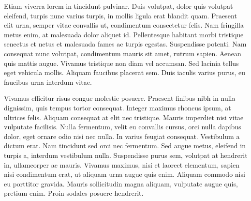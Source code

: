 \documentclass{article}
\begin{document}
Etiam viverra lorem in tincidunt pulvinar.
Duis volutpat, dolor quis volutpat eleifend, turpis nunc varius turpis, in mollis ligula erat blandit quam.
Praesent elit urna, semper vitae convallis ut, condimentum consectetur felis.
Nam fringilla metus enim, at malesuada dolor aliquet id.
Pellentesque habitant morbi tristique senectus et netus et malesuada fames ac turpis egestas.
Suspendisse potenti.
Nam consequat nunc volutpat, condimentum mauris sit amet, rutrum sapien.
Aenean quis mattis augue.
Vivamus tristique non diam vel accumsan.
Sed lacinia tellus eget vehicula mollis.
Aliquam faucibus placerat sem.
Duis iaculis varius purus, eu faucibus urna interdum vitae.

Vivamus efficitur risus congue molestie posuere.
Praesent finibus nibh in nulla dignissim, quis tempus tortor consequat.
Integer maximus rhoncus ipsum, at ultrices felis.
Aliquam consequat at elit nec tristique.
Mauris imperdiet nisi vitae vulputate facilisis.
Nulla fermentum, velit eu convallis cursus, orci nulla dapibus dolor, eget ornare odio nisi nec nulla.
In varius feugiat consequat.
Vestibulum a dictum erat.
Nam tincidunt sed orci nec fermentum.
Sed augue metus, eleifend in turpis a, interdum vestibulum nulla.
Suspendisse purus sem, volutpat at hendrerit in, ullamcorper ac mauris.
Vivamus maximus, nisi et laoreet elementum, sapien nisi condimentum erat, ut aliquam urna augue quis enim.
Aliquam commodo nisi eu porttitor gravida.
Mauris sollicitudin magna aliquam, vulputate augue quis, pretium enim.
Proin sodales posuere hendrerit.
\end{document}
